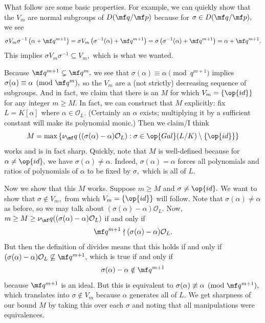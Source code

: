 What follow are some basic properties. For example, we can quickly show that the $V_m$ are normal subgroups of $D(\mf q/\mf p)$ because for $\sigma\in D(\mf q/\mf p),$ we see
\[\sigma V_m\sigma^{-1}\left(\alpha+\mf q^{m+1}\right)=\sigma V_m\left(\sigma^{-1}(\alpha)+\mf q^{m+1}\right)=\sigma\left(\sigma^{-1}(\alpha)+\mf q^{m+1}\right)=\alpha+\mf q^{m+1}.\]
This implies $\sigma V_m\sigma^{-1}\subseteq V_m,$ which is what we wanted.

Because $\mf q^{m+1}\subsetneq\mf q^m,$ we see that $\sigma(\alpha)\equiv\alpha\pmod{q^{m+1}}$ implies $\sigma(\alpha)\equiv\alpha\pmod{\mf q^m},$ so the $V_m$ are a (not strictly) decreasing sequence of subgroups. And in fact, we claim that there is an $M$ for which $V_m=\{\op{id}\}$ for any integer $m\ge M.$ In fact, we can construct that $M$ explicitly: fix $L=K[\alpha]$ where $\alpha\in\mathcal O_L.$ (Certainly an $\alpha$ exists; multiplying it by a sufficient constant will make its polynomial monic.) Then we claim/I think
\[M=\max\left\{\nu_\mf q\left((\sigma(\alpha)-\alpha)\mathcal O_L\right):\sigma\in\op{Gal}(L/K)\setminus\{\op{id}\}\right\}\]
works and is in fact sharp. Quickly, note that $M$ is well-defined because for $\alpha\ne\op{id},$ we have $\sigma(\alpha)\ne\alpha.$ Indeed, $\sigma(\alpha)=\alpha$ forces all polynomials and ratios of polynomials of $\alpha$ to be fixed by $\sigma,$ which is all of $L.$

Now we show that this $M$ works. Suppose $m\ge M$ and $\sigma\ne\op{id}.$ We want to show that $\sigma\notin V_m,$ from which $V_m=\{\op{id}\}$ will follow. Note that $\sigma(\alpha)\ne\alpha$ as before, so we may talk about $(\sigma(\alpha)-\alpha)\mathcal O_L.$ Now, $m\ge M\ge\nu_\mf q((\sigma(\alpha)-\alpha)\mathcal O_L)$ if and only if
\[\mf q^{m+1}\nmid(\sigma(\alpha)-\alpha)\mathcal O_L.\]
But then the definition of divides means that this holds if and only if $(\sigma(\alpha)-\alpha)\mathcal O_L\not\subseteq\mf q^{m+1},$ which is true if and only if
\[\sigma(\alpha)-\alpha\notin\mf q^{m+1}\]
because $\mf q^{m+1}$ is an ideal. But this is equivalent to $\sigma(\alpha)\not\equiv\alpha\pmod{\mf q^{m+1}},$ which translates into $\sigma\notin V_m$ because $\alpha$ generates all of $L.$ We get sharpness of our bound $M$ by taking this over each $\sigma$ and noting that all manipulations were equivalences.

